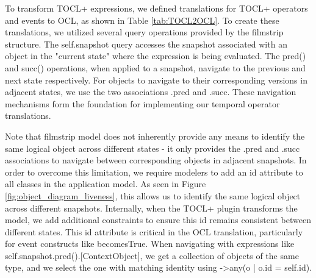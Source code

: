 To transform TOCL+ expressions, we defined translations for TOCL+ operators and 
events to OCL, as shown in Table \ref{tab:TOCL2OCL}. To create these translations, 
we utilized several query operations provided by the filmstrip structure. 
The self.snapshot query accesses the snapshot associated with an object in the 
"current state" where the expression is being evaluated. The pred() and succ() 
operations, when applied to a snapshot, navigate to the previous and next state 
respectively. For objects to navigate to their corresponding versions in adjacent 
states, we use the two associations .pred and .succ. These navigation mechanisms 
form the foundation for implementing our temporal operator translations.

Note that filmstrip model does not inherently provide any means to identify the same 
logical object across different states - it only provides the .pred and .succ 
associations to navigate between corresponding objects in adjacent snapshots. 
In order to overcome this limitation, we require modelers to add an id attribute 
to all classes in the application model. As seen in Figure \ref{fig:object_diagram_liveness}, 
this allows us to identify the same logical object across different snapshots. 
Internally, when the TOCL+ plugin transforms the model, we add additional 
constraints to ensure this id remains consistent between different states. 
This id attribute is critical in the OCL translation, particularly for event 
constructs like becomesTrue. When navigating with expressions like 
self.snapshot.pred().[ContextObject], we get a collection of objects of the same 
type, and we select the one with matching identity using ->any(o | o.id = self.id).

